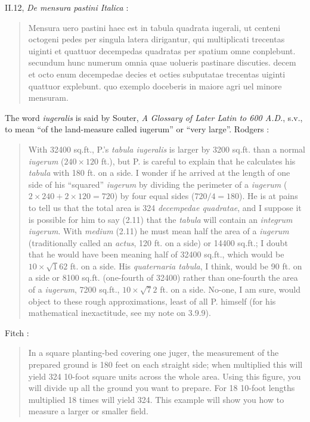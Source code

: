 \documentclass{amsart}
\theoremstyle{definition}
\begin{document}
II.12, {\em De mensura pastini Italica} \cite[p.~55]{palladii}:

\begin{quote}
Mensura uero pastini haec est in tabula quadrata iugerali,
ut centeni octogeni pedes per singula latera dirigantur,
qui multiplicati trecentas uiginti et quattuor decempedas
quadratas per spatium omne conplebunt.
secundum hunc numerum omnia quae uolueris pastinare discuties.
decem et octo enum decempedae decies et octies subputatae
trecentas uiginti quattuor explebunt.
quo exemplo doceberis in maiore agri uel minore mensuram. 
\end{quote}

The word {\em iugeralis} is said by Souter, {\em A Glossary of Later Latin to 600 A.D.}, s.v., to mean ``of the land-measure called iugerum'' or ``very large''. 
Rodgers \cite[p.~96]{palladius}:

\begin{quote}
With 32400 sq.ft., P.'s {\em tabula iugeralis} is larger by 3200 sq.ft. than a normal {\em iugerum} ($240 \times 120$ ft.),
but P. is careful to explain that he calculates his {\em tabula} with 180 ft. on a side. I wonder if he arrived at the length of one side
of his ``squared'' {\em iugerum} by dividing the perimeter of a {\em iugerum} ($2 \times 240+2 \times 120=720$) by four equal
sides ($720/4=180$). He is at pains to tell us that the total area is 324 {\em decempedae quadratae}, and I suppose  it is
possible for him to say (2.11) that the {\em tabula} will contain an {\em integrum iugerum}. With {\em medium} (2.11) he must mean
half the area of a {\em iugerum} (traditionally called an {\em actus}, 120 ft. on a side) or 14400 sq.ft.; I doubt that he would
have been meaning half of 32400 sq.ft., which would be $10 \times \surd 162$ ft. on a side. His {\em quaternaria tabula}, I think,
would be 90 ft. on a side or 8100 sq.ft. (one-fourth of 32400) rather than one-fourth the area of a {\em iugerum}, 7200 sq.ft.,
$10 \times \surd 72$ ft. on a side. No-one, I am sure, would object to these rough approximations, least of all P. himself (for his mathematical inexactitude, see my note
on 3.9.9).
\end{quote}

Fitch \cite[p.~75]{fitch}:

\begin{quote}
In a square planting-bed covering one juger, the measurement of the prepared ground is 180 feet on each straight side; when multiplied this will yield 324 10-foot square units across the whole area. Using this figure, you will divide up all the ground you want to prepare. For 18 10-foot lengths multiplied 18 times will yield 324.
This example will show you how to measure a larger or smaller field.
\end{quote}
\end{document}
